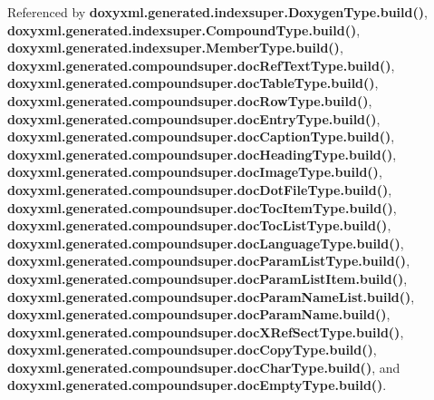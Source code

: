 Referenced by {\bf doxyxml.\+generated.\+indexsuper.\+Doxygen\+Type.\+build()}, {\bf doxyxml.\+generated.\+indexsuper.\+Compound\+Type.\+build()}, {\bf doxyxml.\+generated.\+indexsuper.\+Member\+Type.\+build()}, {\bf doxyxml.\+generated.\+compoundsuper.\+doc\+Ref\+Text\+Type.\+build()}, {\bf doxyxml.\+generated.\+compoundsuper.\+doc\+Table\+Type.\+build()}, {\bf doxyxml.\+generated.\+compoundsuper.\+doc\+Row\+Type.\+build()}, {\bf doxyxml.\+generated.\+compoundsuper.\+doc\+Entry\+Type.\+build()}, {\bf doxyxml.\+generated.\+compoundsuper.\+doc\+Caption\+Type.\+build()}, {\bf doxyxml.\+generated.\+compoundsuper.\+doc\+Heading\+Type.\+build()}, {\bf doxyxml.\+generated.\+compoundsuper.\+doc\+Image\+Type.\+build()}, {\bf doxyxml.\+generated.\+compoundsuper.\+doc\+Dot\+File\+Type.\+build()}, {\bf doxyxml.\+generated.\+compoundsuper.\+doc\+Toc\+Item\+Type.\+build()}, {\bf doxyxml.\+generated.\+compoundsuper.\+doc\+Toc\+List\+Type.\+build()}, {\bf doxyxml.\+generated.\+compoundsuper.\+doc\+Language\+Type.\+build()}, {\bf doxyxml.\+generated.\+compoundsuper.\+doc\+Param\+List\+Type.\+build()}, {\bf doxyxml.\+generated.\+compoundsuper.\+doc\+Param\+List\+Item.\+build()}, {\bf doxyxml.\+generated.\+compoundsuper.\+doc\+Param\+Name\+List.\+build()}, {\bf doxyxml.\+generated.\+compoundsuper.\+doc\+Param\+Name.\+build()}, {\bf doxyxml.\+generated.\+compoundsuper.\+doc\+X\+Ref\+Sect\+Type.\+build()}, {\bf doxyxml.\+generated.\+compoundsuper.\+doc\+Copy\+Type.\+build()}, {\bf doxyxml.\+generated.\+compoundsuper.\+doc\+Char\+Type.\+build()}, and {\bf doxyxml.\+generated.\+compoundsuper.\+doc\+Empty\+Type.\+build()}.



